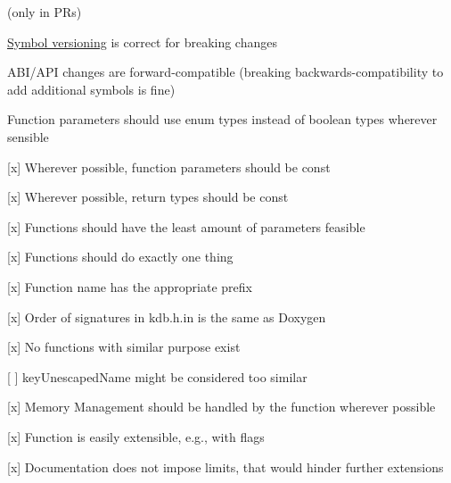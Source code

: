 (only in P\+Rs)


\begin{DoxyItemize}
\item \hyperlink{doc_dev_symbol-versioning_md}{Symbol versioning} is correct for breaking changes
\item A\+B\+I/\+A\+PI changes are forward-\/compatible (breaking backwards-\/compatibility to add additional symbols is fine)
\end{DoxyItemize}


\begin{DoxyItemize}
\item Function parameters should use enum types instead of boolean types wherever sensible
\item \mbox{[}x\mbox{]} Wherever possible, function parameters should be {\ttfamily const}
\item \mbox{[}x\mbox{]} Wherever possible, return types should be {\ttfamily const}
\item \mbox{[}x\mbox{]} Functions should have the least amount of parameters feasible
\end{DoxyItemize}


\begin{DoxyItemize}
\item \mbox{[}x\mbox{]} Functions should do exactly one thing
\item \mbox{[}x\mbox{]} Function name has the appropriate prefix
\item \mbox{[}x\mbox{]} Order of signatures in kdb.\+h.\+in is the same as Doxygen
\item \mbox{[}x\mbox{]} No functions with similar purpose exist
\begin{DoxyItemize}
\item \mbox{[} \mbox{]} {\ttfamily key\+Unescaped\+Name} might be considered too similar
\end{DoxyItemize}
\end{DoxyItemize}


\begin{DoxyItemize}
\item \mbox{[}x\mbox{]} Memory Management should be handled by the function wherever possible
\end{DoxyItemize}


\begin{DoxyItemize}
\item \mbox{[}x\mbox{]} Function is easily extensible, e.\+g., with flags
\item \mbox{[}x\mbox{]} Documentation does not impose limits, that would hinder further extensions
\end{DoxyItemize}


